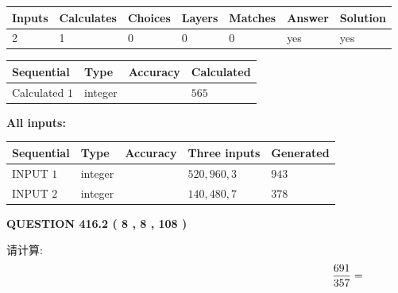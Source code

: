 \documentclass{ctexart}
\begin{document}
 

 
   
   
   
   
\noindent\begin{tabular}{|l|l|l|l|l|l|l|}
 \hline
Inputs & Calculates & Choices & Layers & Matches & Answer & Solution \\ \hline
 2  & 
 1  & 
 0
  & 
 0  & 
 0  & 
  yes & 
  yes 
  \\ \hline
 \end{tabular}
   
   
   
   
\noindent{}
   
   
  
  
\noindent\begin{tabular}{|l|l|l|l|}
\hline
 Sequential & Type & Accuracy & Calculated \\ 
\hline
 
 
  Calculated $  1 $ & integer &  & 
  $ 565 $ 
 \\  \hline  
 \end{tabular}
   
   
   
   
\noindent\vspace{0.1in}\hspace{-0.08in} {\textbf{\Large{All inputs: }}}
   
   
  
  
\noindent\begin{tabular}{|l|l|l|l|l|}
\hline
 Sequential & Type & Accuracy & Three inputs & Generated \\ 
\hline
 
 
  INPUT $  1 $ & integer &  & $
 520
 , 
 960
 , 
 3
 $ & $ 943 $ 
 \\  \hline  
 
 
  INPUT $  2 $ & integer &  & $
 140
 , 
 480
 , 
 7
 $ & $ 378 $ 
 \\  \hline  
 \end{tabular}
   
   
  
\vspace{0.2in}
  
{\textbf{\Large{QUESTION
416.2 
 ( 8 , 8 , 108 )
}}}
  
  
 
请计算:
\begin{equation}
\frac { %
691 }  {  %
357} = \nonumber
\end{equation}
 
\end{document}
